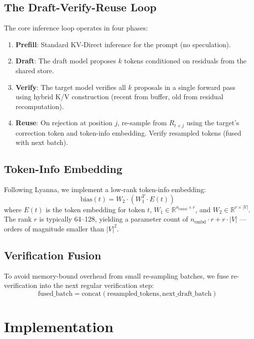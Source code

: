 \documentclass[11pt]{article}
\begin{document}
\subsection{The Draft-Verify-Reuse Loop}

The core inference loop operates in four phases:

\begin{enumerate}
    \item \textbf{Prefill}: Standard KV-Direct inference for the prompt (no speculation).
    \item \textbf{Draft}: The draft model proposes $k$ tokens conditioned on residuals from the shared store.
    \item \textbf{Verify}: The target model verifies all $k$ proposals in a single forward pass using hybrid K/V construction (recent from buffer, old from residual recomputation).
    \item \textbf{Reuse}: On rejection at position $j$, re-sample from $R_{t+j}$ using the target's correction token and token-info embedding. Verify resampled tokens (fused with next batch).
\end{enumerate}

\subsection{Token-Info Embedding}

Following Lyanna, we implement a low-rank token-info embedding:
\begin{equation}
    \text{bias}(t) = W_2 \cdot (W_1^T \cdot E(t))
\end{equation}
where $E(t)$ is the token embedding for token $t$, $W_1 \in \mathbb{R}^{n_{\text{embd}} \times r}$, and $W_2 \in \mathbb{R}^{r \times |V|}$. The rank $r$ is typically 64--128, yielding a parameter count of $n_{\text{embd}} \cdot r + r \cdot |V|$ — orders of magnitude smaller than $|V|^2$.

\subsection{Verification Fusion}

To avoid memory-bound overhead from small re-sampling batches, we fuse re-verification into the next regular verification step:
$$\text{fused\_batch} = \text{concat}(\text{resampled\_tokens}, \text{next\_draft\_batch})$$

\section{Implementation}
\end{document}
